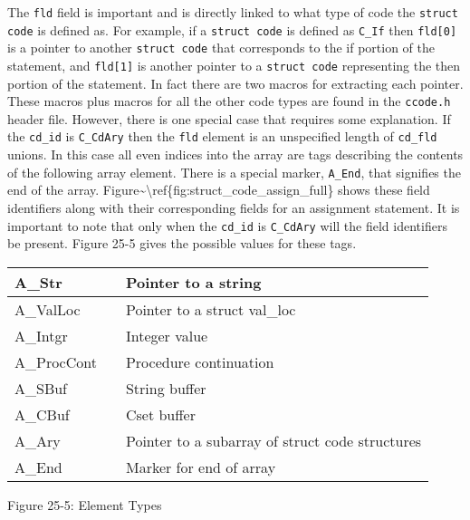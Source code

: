 The \texttt{fld} field is important and is directly linked to what
type of code the \texttt{struct code} is defined as.  For example, if
a \texttt{struct code} is defined as \texttt{C\_If} then
\texttt{fld[0]} is a pointer to another \texttt{struct code} that
corresponds to the if portion of the statement, and \texttt{fld[1]} is
another pointer to a \texttt{struct code} representing the then
portion of the statement. In fact there are two macros for extracting
each pointer. These macros plus macros for all the other code types
are found in the \texttt{ccode.h} header file. However, there is one
special case that requires some explanation. If the \texttt{cd\_id} is
\texttt{C\_CdAry} then the \texttt{fld} element is an unspecified
length of \texttt{cd\_fld} unions. In this case all even indices into
the array are tags describing the contents of the following array
element. There is a special marker, \texttt{A\_End}, that signifies
the end of the array.
Figure\~{}{\textbackslash}ref\{fig:struct\_code\_assign\_full\} shows
these field identifiers along with their corresponding fields for an
assignment statement. It is important to note that only when the
\texttt{cd\_id} is \texttt{C\_CdAry} will the field identifiers be
present. Figure 25-5 gives the possible values for these tags.

\begin{center}
\tabletail{}
\tablelasttail{}
\begin{supertabular}{|m{0.93935984in}|m{0.41775984in}|m{3.12266in}|}
\hline
 A\_Str &
 &
 Pointer to a string\\\hline
 A\_ValLoc &
 &
 Pointer to a struct val\_loc\\\hline
 A\_Intgr &
 &
 Integer value\\\hline
 A\_ProcCont &
 &
 Procedure continuation\\\hline
 A\_SBuf &
 &
 String buffer\\\hline
 A\_CBuf &
 &
 Cset buffer\\\hline
 A\_Ary &
 &
 Pointer to a subarray of struct code structures\\\hline
 A\_End &
 &
 Marker for end of array\\\hline
\end{supertabular}
\end{center}
{\centering{}
Figure 25-5: Element Types
\par}

